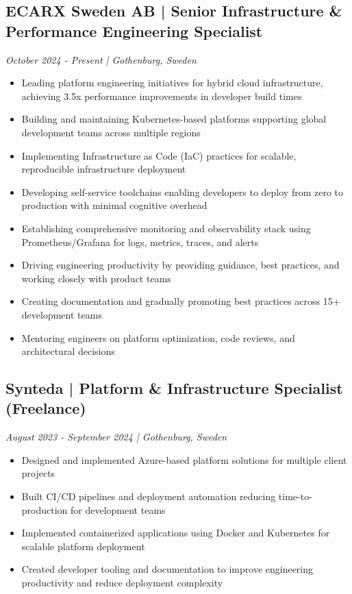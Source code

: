 \documentclass[11pt,a4paper]{article}
\begin{document}
\subsection*{ECARX Sweden AB | Senior Infrastructure \& Performance Engineering Specialist}
\textit{October 2024 - Present | Gothenburg, Sweden}
\begin{itemize}[noitemsep]
\item Leading platform engineering initiatives for hybrid cloud infrastructure, achieving 3.5x performance improvements in developer build times
\item Building and maintaining Kubernetes-based platforms supporting global development teams across multiple regions
\item Implementing Infrastructure as Code (IaC) practices for scalable, reproducible infrastructure deployment
\item Developing self-service toolchains enabling developers to deploy from zero to production with minimal cognitive overhead
\item Establishing comprehensive monitoring and observability stack using Prometheus/Grafana for logs, metrics, traces, and alerts
\item Driving engineering productivity by providing guidance, best practices, and working closely with product teams
\item Creating documentation and gradually promoting best practices across 15+ development teams
\item Mentoring engineers on platform optimization, code reviews, and architectural decisions
\end{itemize}

\subsection*{Synteda | Platform \& Infrastructure Specialist (Freelance)}
\textit{August 2023 - September 2024 | Gothenburg, Sweden}
\begin{itemize}[noitemsep]
\item Designed and implemented Azure-based platform solutions for multiple client projects
\item Built CI/CD pipelines and deployment automation reducing time-to-production for development teams
\item Implemented containerized applications using Docker and Kubernetes for scalable platform deployment
\item Created developer tooling and documentation to improve engineering productivity and reduce deployment complexity
\end{itemize}
\end{document}
